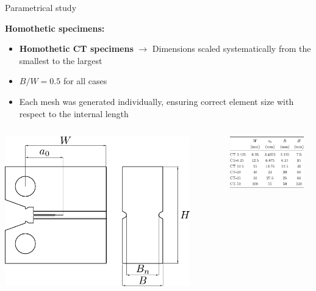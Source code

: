 \documentclass[9pt]{beamer}
\begin{document}
\begin{frame}{Parametrical study}

\textcolor{MINESBlue}{\textbf{\large Homothetic specimens:}}
\vspace{0.15cm}
    \begin{itemize}
        \item \textbf{Homothetic CT specimens} $\rightarrow$ Dimensions scaled systematically from the smallest to the largest
        \vspace{0.15cm}
        \item $B/W = 0.5$ for all cases
        \vspace{0.15cm}
        \item Each mesh was generated individually, ensuring correct element size with respect to the internal length
    \end{itemize}

    \vspace{0.2cm}

    \begin{columns}
        \centering
        \includegraphics[width=0.87\textwidth]{Images/geo_homothetic.pdf}
        
        \centering
        \includegraphics[width=0.9\textwidth]{Images/tab_homo.pdf}
    \end{columns}


\end{frame}
\end{document}
